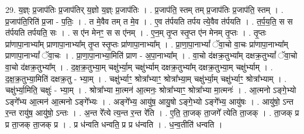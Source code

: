 \documentclass[17pt]{extarticle}
\begin{document}
29. य॒ज्ञ्ः प्र॒जाप॑तिः प्र॒जाप॑तिर् य॒ज्ञो य॒ज्ञ्ः प्र॒जाप॑तिः । . प्र॒जाप॑ति॒ स्तम् तम् प्र॒जाप॑तिः प्र॒जाप॑ति॒ स्तम् । . प्र॒जाप॑ति॒रिति॑ प्र॒जा - प॒तिः॒ । . त मे॒वैव तम् त मे॒व । . ए॒व त॑र्पयति तर्पय त्ये॒वैव त॑र्पयति । . त॒र्प॒य॒ति॒ स स त॑र्पयति तर्पयति॒ सः । . स ए॑न मेनꣳ॒॒ स स ए॑नम् । . ए॒न॒म् तृ॒प्त स्तृ॒प्त ए॑न मेनम् तृ॒प्तः । . तृ॒प्तः प्रा॑णापा॒नाभ्या᳚म् प्राणापा॒नाभ्या᳚म् तृ॒प्त स्तृ॒प्तः प्रा॑णापा॒नाभ्या᳚म् । . प्रा॒णा॒पा॒नाभ्यां᳚ ॅवा॒चो वा॒चः प्रा॑णापा॒नाभ्या᳚म् प्राणापा॒नाभ्यां᳚ ॅवा॒चः । . प्रा॒णा॒पा॒नाभ्या॒मिति॑ प्राण - अ॒पा॒नाभ्या᳚म् । . वा॒चो द॑क्षक्र॒तुभ्या᳚म् दक्षक्र॒तुभ्यां᳚ ॅवा॒चो वा॒चो द॑क्षक्र॒तुभ्या᳚म् । . द॒क्ष॒क्र॒तुभ्या॒म् चक्षु॑र्भ्या॒म् चक्षु॑र्भ्याम् दक्षक्र॒तुभ्या᳚म् दक्षक्र॒तुभ्या॒म् चक्षु॑र्भ्याम् । . द॒क्ष॒क्र॒तुभ्या॒मिति॑ दक्षक्र॒तु - भ्या॒म् । . चक्षु॑र्भ्याꣳ॒॒ श्रोत्रा᳚भ्याꣳ॒॒ श्रोत्रा᳚भ्या॒म् चक्षु॑र्भ्या॒म् चक्षु॑र्भ्याꣳ॒॒ श्रोत्रा᳚भ्याम् । . चक्षु॑र्भ्या॒मिति॒ चक्षुः॑ - भ्या॒म् । . श्रोत्रा᳚भ्या मा॒त्मन॑ आ॒त्मनः॒ श्रोत्रा᳚भ्याꣳ॒॒ श्रोत्रा᳚भ्या मा॒त्मनः॑ । . आ॒त्मनो ऽङ्गे॒भ्यो ऽङ्गे᳚भ्य आ॒त्मन॑ आ॒त्मनो ऽङ्गे᳚भ्यः । . अङ्गे᳚भ्य॒ आयु॑ष॒ आयु॒षो ऽङ्गे॒भ्यो ऽङ्गे᳚भ्य॒ आयु॑षः । . आयु॑षो॒ ऽन्त र॒न्त रायु॑ष॒ आयु॑षो॒ ऽन्तः । . अ॒न्त रे᳚त्ये त्य॒न्त र॒न्त रे॑ति । . ए॒ति॒ ता॒जक् ता॒जगे᳚ त्येति ता॒जक् । . ता॒जक् प्र प्र ता॒जक् ता॒जक् प्र । . प्र ध॑न्वति धन्वति॒ प्र प्र ध॑न्वति । . ध॒न्व॒तीति॑ धन्वति । \newline
\end{document}

